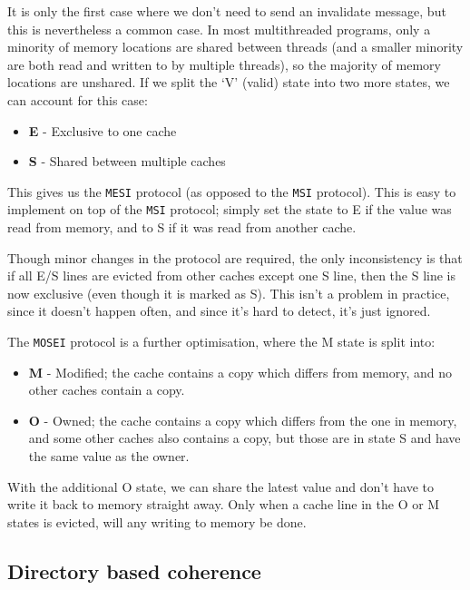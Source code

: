 It is only the first case where we don't need to send an invalidate message, but
this is nevertheless a common case. In most multithreaded programs, only a
minority of memory locations are shared between threads (and a smaller minority
are both read and written to by multiple threads), so the majority of memory
locations are unshared. If we split the `V' (valid) state into two more states,
we can account for this case:

\begin{itemize}
  \item \textbf{E} - Exclusive to one cache
  \item \textbf{S} - Shared between multiple caches
\end{itemize}

This gives us the \texttt{MESI} protocol (as opposed to the \texttt{MSI}
protocol). This is easy to implement on top of the \texttt{MSI} protocol; simply
set the state to E if the value was read from memory, and to S if it was read
from another cache.

Though minor changes in the protocol are required, the only inconsistency is
that if all E/S lines are evicted from other caches except one S line, then the
S line is now exclusive (even though it is marked as S). This isn't a problem in
practice, since it doesn't happen often, and since it's hard to detect, it's
just ignored.

The \texttt{MOSEI} protocol is a further optimisation, where the M state is
split into:

\begin{itemize}
  \item \textbf{M} - Modified; the cache contains a copy which differs from 
  memory, and no other caches contain a copy.
  \item \textbf{O} - Owned; the cache contains a copy which differs from the one 
  in memory, and some other caches also contains a copy, but those are in state 
  S and have the same value as the owner.
\end{itemize}

With the additional O state, we can share the latest value and don't have to
write it back to memory straight away. Only when a cache line in the O or M
states is evicted, will any writing to memory be done.

\subsection{Directory based coherence}


